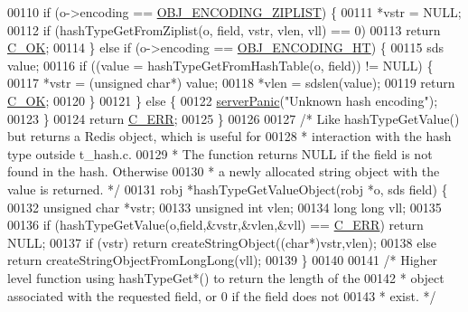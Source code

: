 \begin{DoxyCode}
00110     \textcolor{keywordflow}{if} (o->encoding == \hyperlink{server_8h_aabf064ede983103f1fd0df2086e84eee}{OBJ\_ENCODING\_ZIPLIST}) \{
00111         *vstr = NULL;
00112         \textcolor{keywordflow}{if} (hashTypeGetFromZiplist(o, field, vstr, vlen, vll) == 0)
00113             \textcolor{keywordflow}{return} \hyperlink{server_8h_a303769ef1065076e68731584e758d3e1}{C\_OK};
00114     \} \textcolor{keywordflow}{else} \textcolor{keywordflow}{if} (o->encoding == \hyperlink{server_8h_a9c10219f68afc557d510d108257d238b}{OBJ\_ENCODING\_HT}) \{
00115         sds value;
00116         \textcolor{keywordflow}{if} ((value = hashTypeGetFromHashTable(o, field)) != NULL) \{
00117             *vstr = (\textcolor{keywordtype}{unsigned} \textcolor{keywordtype}{char}*) value;
00118             *vlen = sdslen(value);
00119             \textcolor{keywordflow}{return} \hyperlink{server_8h_a303769ef1065076e68731584e758d3e1}{C\_OK};
00120         \}
00121     \} \textcolor{keywordflow}{else} \{
00122         \hyperlink{server_8h_a11cc378e7778a830b41240578de3b204}{serverPanic}(\textcolor{stringliteral}{"Unknown hash encoding"});
00123     \}
00124     \textcolor{keywordflow}{return} \hyperlink{server_8h_af98ac28d5f4d23d7ed5985188e6fb7d1}{C\_ERR};
00125 \}
00126 
00127 \textcolor{comment}{/* Like hashTypeGetValue() but returns a Redis object, which is useful for}
00128 \textcolor{comment}{ * interaction with the hash type outside t\_hash.c.}
00129 \textcolor{comment}{ * The function returns NULL if the field is not found in the hash. Otherwise}
00130 \textcolor{comment}{ * a newly allocated string object with the value is returned. */}
00131 robj *hashTypeGetValueObject(robj *o, sds field) \{
00132     \textcolor{keywordtype}{unsigned} \textcolor{keywordtype}{char} *vstr;
00133     \textcolor{keywordtype}{unsigned} \textcolor{keywordtype}{int} vlen;
00134     \textcolor{keywordtype}{long} \textcolor{keywordtype}{long} vll;
00135 
00136     \textcolor{keywordflow}{if} (hashTypeGetValue(o,field,&vstr,&vlen,&vll) == \hyperlink{server_8h_af98ac28d5f4d23d7ed5985188e6fb7d1}{C\_ERR}) \textcolor{keywordflow}{return} NULL;
00137     \textcolor{keywordflow}{if} (vstr) \textcolor{keywordflow}{return} createStringObject((\textcolor{keywordtype}{char}*)vstr,vlen);
00138     \textcolor{keywordflow}{else} \textcolor{keywordflow}{return} createStringObjectFromLongLong(vll);
00139 \}
00140 
00141 \textcolor{comment}{/* Higher level function using hashTypeGet*() to return the length of the}
00142 \textcolor{comment}{ * object associated with the requested field, or 0 if the field does not}
00143 \textcolor{comment}{ * exist. */}

\end{DoxyCode}
